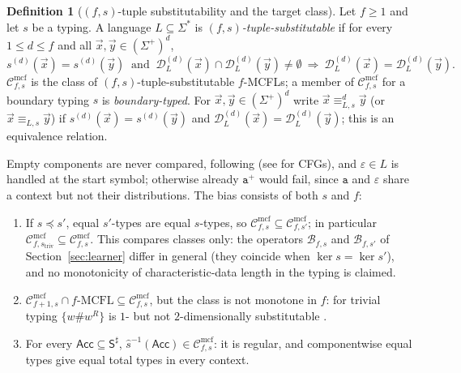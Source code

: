\documentclass[11pt]{article}
\numberwithin{equation}{section}
\theoremstyle{plain}
\theoremstyle{definition}
\newtheorem{definition}[theorem]{Definition}
\theoremstyle{remark}
\newcommand{\Cmcf}[2]{\mathcal{C}^{\mathrm{mcf}}_{#1,#2}}
\newcommand{\D}{\mathcal{D}}
\newcommand{\tuple}[1]{\vec{#1}}
\newcommand{\eps}{\varepsilon}
\begin{document}
\begin{definition}[$(f,s)$-tuple substitutability and the target class]
\label{def:tuple-substitutable}
\label{def:class-cmcf}
Let $f\ge1$ and let $s$ be a typing.  A language $L\subseteq\Sigma^*$ is
\emph{$(f,s)$-tuple-substitutable} if for every $1\le d\le f$ and all
$\tuple x,\tuple y\in(\Sigma^+)^d$,
\[
 s^{(d)}(\tuple x)=s^{(d)}(\tuple y)\ \text{ and }\
 \D_L^{(d)}(\tuple x)\cap\D_L^{(d)}(\tuple y)\ne\emptyset
 \ \Longrightarrow\
 \D_L^{(d)}(\tuple x)=\D_L^{(d)}(\tuple y).
\]
$\Cmcf{f}{s}$ is the class of $(f,s)$-tuple-substitutable $f$-MCFLs; a member
of $\Cmcf{f}{s}$ for a boundary typing $s$ is \emph{boundary-typed}.  For
$\tuple x,\tuple y\in(\Sigma^+)^d$ write $\tuple x\equiv_{L,s}^d\tuple y$ (or
$\tuple x\equiv_{L,s}\tuple y$) if $s^{(d)}(\tuple x)=s^{(d)}(\tuple y)$ and
$\D_L^{(d)}(\tuple x)=\D_L^{(d)}(\tuple y)$; this is an equivalence relation.
\end{definition}

Empty components are never compared, following
\cite[Section~3.1 and footnote~3]{Yoshinaka2011} (see \cite{Clark2013} for
CFGs), and $\eps\in L$ is handled at the start symbol; otherwise already
$\mathtt a^+$ would fail, since $\mathtt a$ and $\eps$ share a context but not
their distributions.  The bias consists of both $s$ and $f$:
\begin{enumerate}[label=\textup{(\alph*)},leftmargin=*]
\item If $s\preceq s'$, equal $s'$-types are equal $s$-types, so
$\Cmcf{f}{s}\subseteq\Cmcf{f}{s'}$; in particular
$\Cmcf{f}{s_{\mathrm{triv}}}\subseteq\Cmcf{f}{s}$.  This compares classes
only: the operators $\mathcal B_{f,s}$ and $\mathcal B_{f,s'}$ of
Section~\ref{sec:learner} differ in general (they coincide when
$\ker s=\ker s'$), and no monotonicity of characteristic-data
length in the typing is claimed.
\item $\Cmcf{f+1}{s}\cap f\text{-}\mathrm{MCFL}\subseteq\Cmcf{f}{s}$, but the
class is not monotone in $f$: for trivial typing $\{w\mathtt{\#}w^R\}$ is
$1$- but not $2$-dimensionally substitutable
\cite[Section~3.1, Example~5]{Yoshinaka2011}.
\item For every $\mathsf{Acc}\subseteq\mathsf S^\sharp$,
$\widehat{s}^{-1}(\mathsf{Acc})\in\Cmcf{f}{s}$: it is regular, and
componentwise equal types give equal total types in every context.
\end{enumerate}
\end{document}
